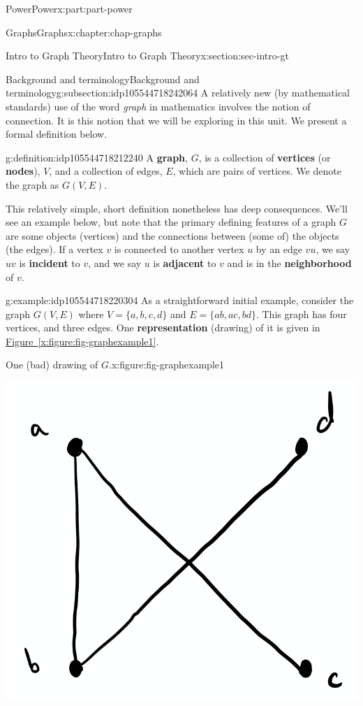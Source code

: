 \documentclass[oneside,10pt,]{book}
\newcommand{\xreffont}{\relax}
\newcommand{\terminology}[1]{\textbf{#1}}
\numberwithin{equation}{section}
\begin{document}
\begin{partptx}{Power}{}{Power}{}{}{x:part:part-power}
\begin{chapterptx}{Graphs}{}{Graphs}{}{}{x:chapter:chap-graphs}
\begin{sectionptx}{Intro to Graph Theory}{}{Intro to Graph Theory}{}{}{x:section:sec-intro-gt}
\begin{subsectionptx}{Background and terminology}{}{Background and terminology}{}{}{g:subsection:idp105544718242064}
A relatively new (by mathematical standards) use of the word \emph{graph} in mathematics involves the notion of connection. It is this notion that we will be exploring in this unit. We present a formal definition below.%
\begin{definition}{}{g:definition:idp105544718212240}%
A \terminology{graph}, \(G\), is a collection of \terminology{vertices} (or \terminology{nodes}), \(V\), and a collection of edges, \(E\), which are pairs of vertices. We denote the graph as \(G(V,E)\).%
\end{definition}
This relatively simple, short definition nonetheless has deep consequences. We'll see an example below, but note that the primary defining features of a graph \(G\) are some objects (vertices) and the connections between (some of) the objects (the edges). If a vertex \(v\) is connected to another vertex \(u\) by an edge \(vu\), we say \(uv\) is \terminology{incident} to \(v\), and we say \(u\) is \terminology{adjacent} to \(v\) and is in the \terminology{neighborhood} of \(v\).%
\begin{example}{}{g:example:idp105544718220304}%
As a straightforward initial example, consider the graph \(G(V, E)\) where \(V = \{a,b,c,d\}\) and \(E = \{ab,ac,bd\}\). This graph has four vertices, and three edges. One \terminology{representation} (drawing) of it is given in \hyperref[x:figure:fig-graphexample1]{Figure~{\xreffont\ref{x:figure:fig-graphexample1}}}. \begin{figureptx}{One (bad) drawing of \(G\).}{x:figure:fig-graphexample1}{}%
\begin{image}{0.25}{0.5}{0.25}%
\includegraphics[width=\linewidth]{images/graph01.png}

\end{image}
\end{figureptx}
\end{example}
\end{subsectionptx}
\end{sectionptx}
\end{chapterptx}
\end{partptx}
\end{document}
